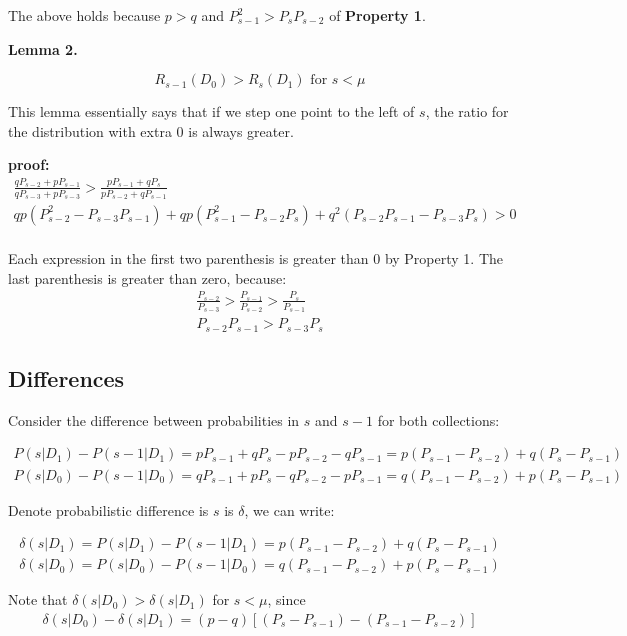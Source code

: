 \documentclass[11pt,draft]{article}
\begin{document}
The above holds because $p>q$ and $P^2_{s-1} > P_sP_{s-2}$ of \textbf{Property 1}.

\textbf{Lemma 2.}

\[ R_{s-1}(D_0) > R_s(D_1)   \text{ for } s< \mu \]

This lemma essentially says that if we step one point to the left of $s$, the ratio for the distribution with extra $0$ is always greater.

\textbf{proof:}
 \begin{align}
 \frac{q P_{s-2}+ pP_{s-1}}{qP_{s-3} + pP_{s-3}} > \frac{pP_{s-1}+ qP_s}{pP_{s-2} + qP_{s-1}} \\
qp(P^2_{s-2} - P_{s-3}P_{s-1}) + qp(P^2_{s-1} - P_{s-2}P_{s}) + q^2 (P_{s-2}P_{s-1} - P_{s-3}P_s)> 0 \\
\end{align}

Each expression in the first two parenthesis is greater than 0 by Property 1.  The last parenthesis is greater than zero, because:
 \begin{align}
\frac{P_{s-2}}{P_{s-3}}  > \frac{P_{s-1}}{P_{s-2}} > \frac{P_{s}}{P_{s-1}} \\
P_{s-2}P_{s-1}  > P_{s-3} P_s
\end{align}
 
\subsection{Differences}

Consider the difference between probabilities in $s$ and $s-1$ for both collections:

 \begin{align}
 P(s | D_1) - P(s-1| D_1) = pP_{s-1} + qP_s - pP_{s-2} - qP_{s-1} = p(P_{s-1}-P_{s-2}) + q(P_s - P_{s-1}) \\
 P(s | D_0) - P(s-1| D_0) = qP_{s-1} + pP_s - qP_{s-2} - pP_{s-1} = q(P_{s-1}-P_{s-2}) + p(P_s - P_{s-1})
\end{align}

Denote probabilistic difference is $s$ is $\delta$, we can write:

 \begin{align}
 \delta(s|D_1) = P(s | D_1) - P(s-1| D_1) =  p(P_{s-1}-P_{s-2}) + q(P_s - P_{s-1}) \\
  \delta(s|D_0) = P(s | D_0) - P(s-1| D_0) =  q(P_{s-1}-P_{s-2}) + p(P_s - P_{s-1})
\end{align}

Note that $\delta(s|D_0) >  \delta(s|D_1)$ for $s < \mu$, since
 \begin{align}
\delta(s|D_0) -  \delta(s|D_1) = (p-q) [ (P_s - P_{s-1})  - (P_{s-1}-P_{s-2}) ]
\end{align}
\end{document}
